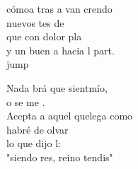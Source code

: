 \begin{cancion}
	cómoa tras a van crendo  \\
	nuevos tes de  \\
	que con dolor pla \\
	y un buen a hacia l part.  \\jump\\
	\begin{chorus}%
	Nada brá que sientmío,\\
	o se me .\\
	Acepta a aquel quelega como  \\
	 habré de olvar  \\
	lo que dijo l:\\
	"siendo res,  reino tendis"\\
	\end{chorus}%
	\jump\\
\end{cancion}%
